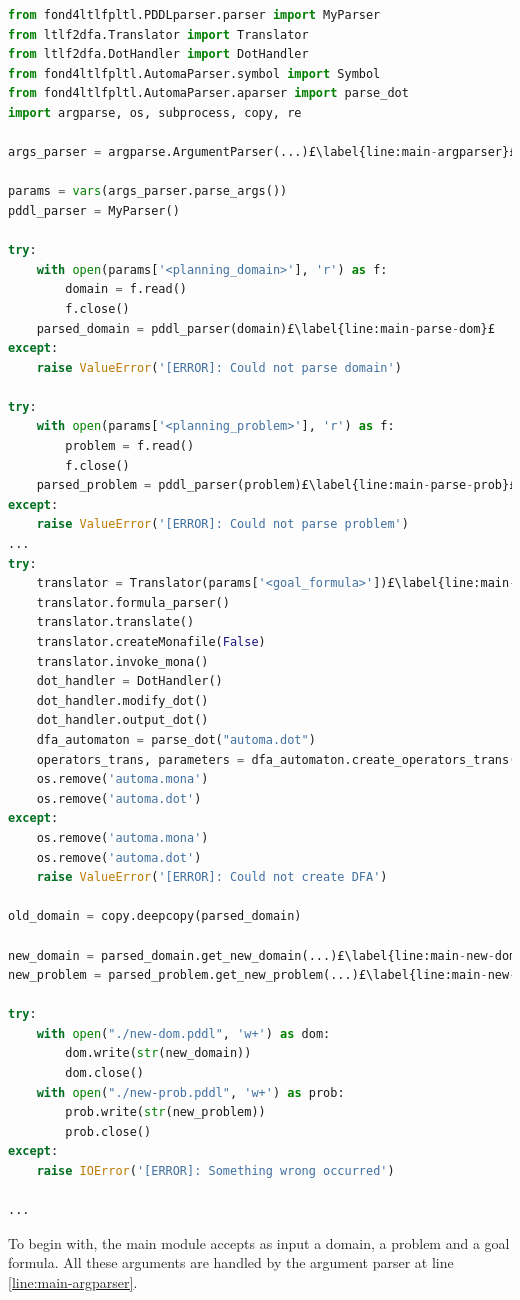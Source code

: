 \begin{lstlisting}[language=Python, style=Python, escapechar = £,  label={code:fond-main}, caption={The \texttt{fond4ltlfpltl.py} module.}]
from fond4ltlfpltl.PDDLparser.parser import MyParser
from ltlf2dfa.Translator import Translator
from ltlf2dfa.DotHandler import DotHandler
from fond4ltlfpltl.AutomaParser.symbol import Symbol
from fond4ltlfpltl.AutomaParser.aparser import parse_dot
import argparse, os, subprocess, copy, re

args_parser = argparse.ArgumentParser(...)£\label{line:main-argparser}£

params = vars(args_parser.parse_args())
pddl_parser = MyParser()

try:
    with open(params['<planning_domain>'], 'r') as f:
        domain = f.read()
        f.close()
    parsed_domain = pddl_parser(domain)£\label{line:main-parse-dom}£
except:
    raise ValueError('[ERROR]: Could not parse domain')

try:
    with open(params['<planning_problem>'], 'r') as f:
        problem = f.read()
        f.close()
    parsed_problem = pddl_parser(problem)£\label{line:main-parse-prob}£
except:
    raise ValueError('[ERROR]: Could not parse problem')
...
try:
    translator = Translator(params['<goal_formula>'])£\label{line:main-dfa}£
    translator.formula_parser()
    translator.translate()
    translator.createMonafile(False)
    translator.invoke_mona()
    dot_handler = DotHandler()
    dot_handler.modify_dot()
    dot_handler.output_dot()
    dfa_automaton = parse_dot("automa.dot")
    operators_trans, parameters = dfa_automaton.create_operators_trans(...)£\label{line:main-transs}£
    os.remove('automa.mona')
    os.remove('automa.dot')
except:
    os.remove('automa.mona')
    os.remove('automa.dot')
    raise ValueError('[ERROR]: Could not create DFA')

old_domain = copy.deepcopy(parsed_domain)

new_domain = parsed_domain.get_new_domain(...)£\label{line:main-new-dom}£
new_problem = parsed_problem.get_new_problem(...)£\label{line:main-new-prob}£

try:
    with open("./new-dom.pddl", 'w+') as dom:
        dom.write(str(new_domain))
        dom.close()
    with open("./new-prob.pddl", 'w+') as prob:
        prob.write(str(new_problem))
        prob.close()
except:
    raise IOError('[ERROR]: Something wrong occurred')
    
...    
\end{lstlisting}
To begin with, the main module accepts as input a \PDDL domain, a \PDDL problem and a goal formula. All these arguments are handled by the argument parser at line \ref{line:main-argparser}.

